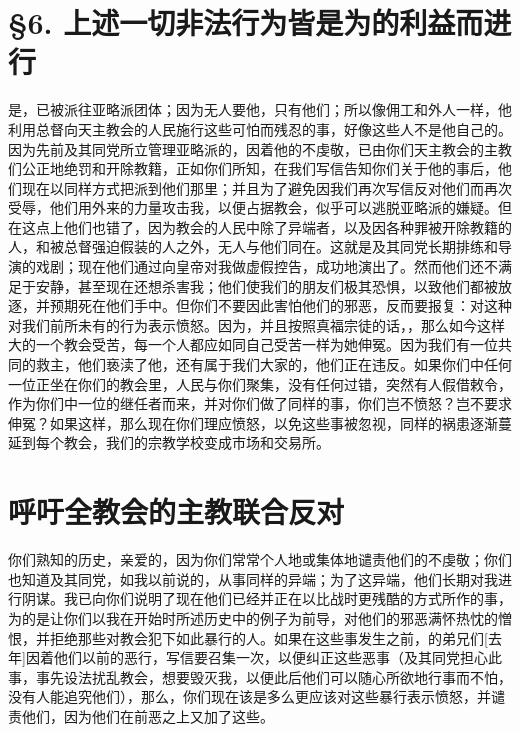 
\section{§6. 上述一切非法行为皆是为的利益而进行}

是，已被派往亚略派团体；因为无人要他，只有他们；所以像佣工和外人一样，他利用总督向天主教会的人民施行这些可怕而残忍的事，好像这些人不是他自己的。因为先前及其同党所立管理亚略派的，因着他的不虔敬，已由你们天主教会的主教们公正地绝罚和开除教籍，正如你们所知，在我们写信告知你们关于他的事后，他们现在以同样方式把派到他们那里；并且为了避免因我们再次写信反对他们而再次受辱，他们用外来的力量攻击我，以便占据教会，似乎可以逃脱亚略派的嫌疑。但在这点上他们也错了，因为教会的人民中除了异端者，以及因各种罪被开除教籍的人，和被总督强迫假装的人之外，无人与他们同在。这就是及其同党长期排练和导演的戏剧；现在他们通过向皇帝对我做虚假控告，成功地演出了。然而他们还不满足于安静，甚至现在还想杀害我；他们使我们的朋友们极其恐惧，以致他们都被放逐，并预期死在他们手中。但你们不要因此害怕他们的邪恶，反而要报复：对这种对我们前所未有的行为表示愤怒。因为，并且按照真福宗徒的话，，那么如今这样大的一个教会受苦，每一个人都应如同自己受苦一样为她伸冤。因为我们有一位共同的救主，他们亵渎了他，还有属于我们大家的，他们正在违反。如果你们中任何一位正坐在你们的教会里，人民与你们聚集，没有任何过错，突然有人假借敕令，作为你们中一位的继任者而来，并对你们做了同样的事，你们岂不愤怒？岂不要求伸冤？如果这样，那么现在你们理应愤怒，以免这些事被忽视，同样的祸患逐渐蔓延到每个教会，我们的宗教学校变成市场和交易所。\par


\section{呼吁全教会的主教联合反对}

你们熟知的历史，亲爱的，因为你们常常个人地或集体地谴责他们的不虔敬；你们也知道及其同党，如我以前说的，从事同样的异端；为了这异端，他们长期对我进行阴谋。我已向你们说明了现在他们已经并正在以比战时更残酷的方式所作的事，为的是让你们以我在开始时所述历史中的例子为前导，对他们的邪恶满怀热忱的憎恨，并拒绝那些对教会犯下如此暴行的人。如果在这些事发生之前，的弟兄们[去年]因着他们以前的恶行，写信要召集一次，以便纠正这些恶事（及其同党担心此事，事先设法扰乱教会，想要毁灭我，以便此后他们可以随心所欲地行事而不怕，没有人能追究他们），那么，你们现在该是多么更应该对这些暴行表示愤怒，并谴责他们，因为他们在前恶之上又加了这些。\par

